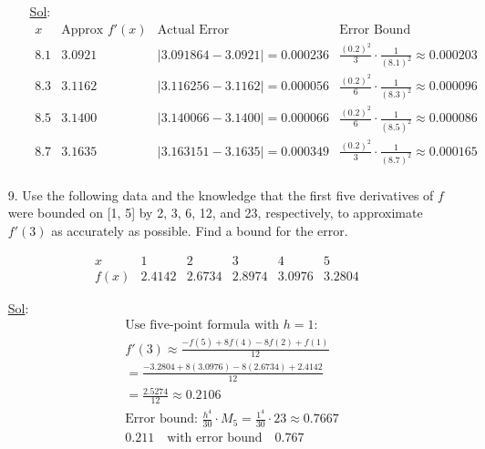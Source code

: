\begin{enumerate}
\begin{enumerate}
        \underline{Sol}:\\

        \[
          \begin{array}{c|c|c|c}
            x & \text{Approx } f'(x) & \text{Actual Error} & \text{Error Bound} \\
            \hline
            8.1 & 3.0921 & |3.091864 - 3.0921| = 0.000236 & \tfrac{(0.2)^2}{3} \cdot \tfrac{1}{(8.1)^2} \approx 0.000203 \\
            8.3 & 3.1162 & |3.116256 - 3.1162| = 0.000056 & \tfrac{(0.2)^2}{6} \cdot \tfrac{1}{(8.3)^2} \approx 0.000096 \\
            8.5 & 3.1400 & |3.140066 - 3.1400| = 0.000066 & \tfrac{(0.2)^2}{6} \cdot \tfrac{1}{(8.5)^2} \approx 0.000086 \\
            8.7 & 3.1635 & |3.163151 - 3.1635| = 0.000349 & \tfrac{(0.2)^2}{3} \cdot \tfrac{1}{(8.7)^2} \approx 0.000165 \\
          \end{array}
        \]
      \end{enumerate}

      \item[9.] Use the following data and the knowledge that the first five derivatives of \(f\) were bounded on [1, 5] by 2, 3, 6, 12, and 23, respectively, to approximate \(f'(3)\) as accurately as possible. Find a bound for the error. 
      
          \[
            \begin{array}{l|l|l|l|l|l}
              x & 1 & 2 & 3 & 4 & 5 \\
              \hline
              f(x) & 2.4142 & 2.6734 & 2.8974 & 3.0976 & 3.2804 
            \end{array}
          \]

        \underline{Sol}:\\


        \[
\begin{aligned}
  & \text{Use five-point formula with } h=1: \\
  & f'(3) \approx \frac{-f(5) + 8f(4) - 8f(2) + f(1)}{12} \\
  & = \frac{-3.2804 + 8(3.0976) - 8(2.6734) + 2.4142}{12} \\
  & = \frac{2.5274}{12} \approx 0.2106 \\
  & \text{Error bound: } \frac{h^4}{30} \cdot M_5 = \frac{1^4}{30} \cdot 23 \approx 0.7667 \\
  & \boxed{0.211} \quad \text{with error bound} \quad \boxed{0.767}
\end{aligned}
\]


\end{enumerate}
